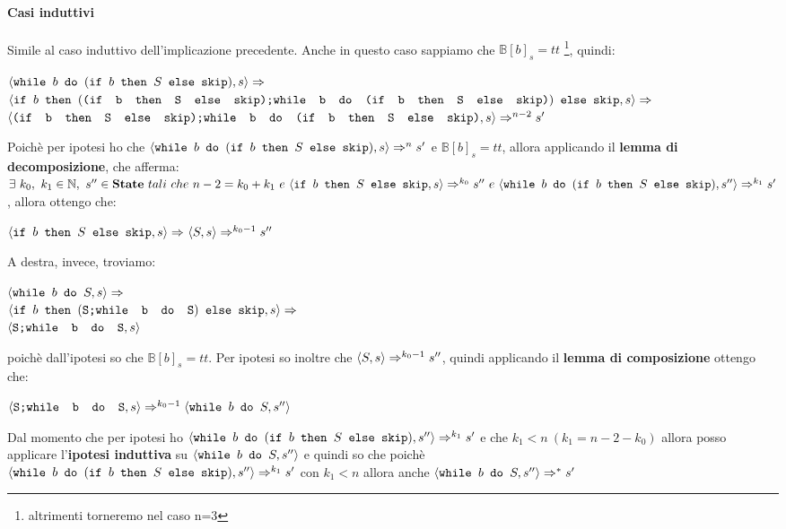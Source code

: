 {   \paragraph{Casi induttivi}
	 Simile al caso induttivo dell'implicazione precedente.
	Anche in questo caso sappiamo che $\mathbb{B}[b]_s=tt$
	\footnote{altrimenti torneremo nel caso n=3}, quindi:
	\begin{center}
	$\confSs{\wbS{b}{(\ifABC{b}{S}{\skipistr})}}{s}\Rar{}$\\
	$\confSs{
		\ifABC{b}
			{(\concat{(\ifABC{b}{S}{\skipistr})}
			{\wbS{b}{(\ifABC{b}{S}{\skipistr})}})}
			{\skipistr}
	}{s}\Rar{}$\\
	$\confSs{\concat{(\ifABC{b}{S}{\skipistr})}{\wbS{b}
	{(\ifABC{b}{S}{\skipistr})}}}{s}\Rar{n-2}s'$
	\end{center}
	Poichè per ipotesi ho che 
	$\confSs{\wbS{b}{(\ifABC{b}{S}{\skipistr})}}{s}\Rar{n}s'$ e 
	$\mathbb{B}[b]_s=tt$, allora applicando il \textbf{lemma di decomposizione},
	che afferma: $\exists{}~k_0,~k_1\in\mathbb{N},~s''\in\states~tali~che~n-2=
	k_0+k_1~e~\confSs{\ifABC{b}{S}{\skipistr}}{s}\Rar{k_0}s''~e~\confSs{\wbS{b}
	{(\ifABC{b}{S}{\skipistr})}}{s''}\Rar{k_1}s'$, allora ottengo che:
	\begin{center}
	$\confSs{\ifABC{b}{S}{\skipistr}}{s}\Rar{}\confSs{S}{s}\Rar{k_0-1}s''$
	\end{center}
	A destra, invece, troviamo:
	\begin{center}
	$\confSs{\wbS{b}{S}}{s}\Rar{}$\\
	$\confSs{
		\ifABC{b}
		{(\concat{S}
		{\wbS{b}{S}})}
		{\skipistr}}{s}\Rar{}$\\
	$\confSs{{\concat{S}{\wbS{b}{S}}}}{s}$
	\end{center}
	poichè dall'ipotesi so che $\mathbb{B}[b]_s=tt$. Per ipotesi so inoltre che
	$\confSs{S}{s}\Rar{k_0-1}s''$, quindi applicando il \textbf{lemma di
	composizione} ottengo che:
	\begin{center}
	$\confSs{{\concat{S}{\wbS{b}{S}}}}{s}\Rar{k_0-1}\confSs{\wbS{b}{S}}{s''}$
	\end{center}
	Dal momento che per ipotesi ho $\confSs{\wbS{b}{(\ifABC{b}{S}
	{\skipistr})}}{s''}\Rar{k_1}s'$ e che $k_1<n~(k_1=n-2-k_0)$ allora posso
	applicare l'\textbf{ipotesi induttiva} su $\confSs{\wbS{b}{S}}{s''}$ e
	quindi so che poichè \\ $\confSs{\wbS{b}{(\ifABC{b}{S}{\skipistr})}}
	{s''}\Rar{k_1}s'$ con $k_1<n$ allora anche 
	$\confSs{\wbS{b}{S}}{s''}\Rar{*}s'$
}
\newpage